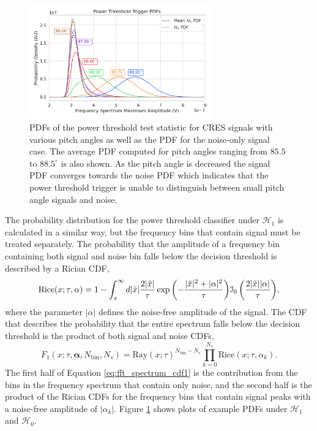 \begin{figure}[htbp]
    \centering
    \includegraphics[width=0.7\textwidth]{figs/Chapter-4/230313_fft_power_threshold_pdf_by_pitch.png}
    \caption{PDFs of the power threshold test statistic for CRES signals with various pitch angles as well as the PDF for the noise-only signal case. The average PDF computed for pitch angles ranging from $85.5$ to $88.5^\circ$ is also shown. As the pitch angle is decreased the signal PDF converges towards the noise PDF which indicates that the power threshold trigger is unable to distinguish between small pitch angle signals and noise. }
    \label{fig:fft_pdf}
\end{figure}

The probability distribution for the power threshold classifier under $\mathcal{H}_1$ is calculated in a similar way, but the frequency bins that contain signal must be treated separately. The probability that the amplitude of a frequency bin containing both signal and noise bin falls below the decision threshold is described by a Rician CDF,
\begin{equation}
    \mathrm{Rice}(x;\tau, \alpha)=1-\int_{x}^{\infty}{d|\Tilde{x}|\frac{2|\Tilde{x}|}{\tau}\exp{\left(-\frac{|\Tilde{x}|^2+|\alpha|^2}{\tau}\right)}\mathcal{I}_0\left(\frac{2|\Tilde{x}||\alpha|}{\tau}\right)},
\end{equation}
where the parameter $|\alpha|$ defines the noise-free amplitude of the signal. The CDF that describes the probability that the entire spectrum falls below the decision threshold is the product of both signal and noise CDFs,
\begin{equation}
    F_1(x;\tau, \mathbf{\alpha}, N_\mathrm{bin}, N_s)=\mathrm{Ray}(x;\tau)^{N_\mathrm{bin}-N_s}\prod_{k=0}^{N_s}{\mathrm{Rice}(x;\tau, \alpha_k)}.
    \label{eq:fft_spectrum_cdf1}
\end{equation}
The first half of Equation \ref{eq:fft_spectrum_cdf1} is the contribution from the bins in the frequency spectrum that contain only noise, and the second half is the product of the Rician CDFs for the frequency bins that contain signal peaks with a noise-free amplitude of $|\alpha_k|$. Figure \ref{fig:fft_pdf} shows plots of example PDFs under $\mathcal{H}_1$ and $\mathcal{H}_0$.


